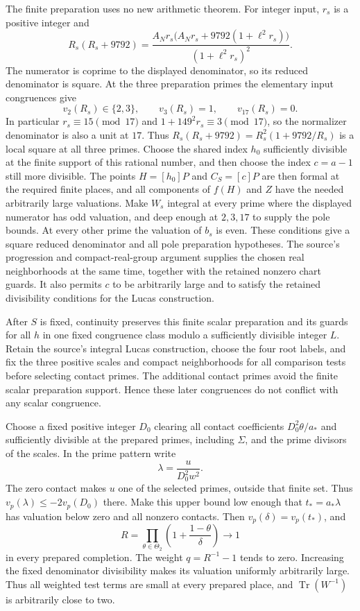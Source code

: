 \documentclass[11pt,a4paper]{article}
\DeclareMathOperator{\Tr}{Tr}\DeclareMathOperator{\Nm}{Nm}
\begin{document}
The finite preparation uses no new arithmetic theorem. For integer
input, $r_s$ is a positive integer and
\[
 R_s(R_s+9792)=
 \frac{A_Nr_s\bigl(A_Nr_s+9792(1+\ell^2r_s)\bigr)}
                    {(1+\ell^2r_s)^2}.
\]
The numerator is coprime to the displayed denominator, so its reduced
denominator is square. At the three preparation primes the elementary
input congruences give
\[
 v_2(R_s)\in\{2,3\},\qquad v_3(R_s)=1,
                       \qquad v_{17}(R_s)=0.
\]
In particular $r_s\equiv15\pmod{17}$ and
$1+149^2r_s\equiv3\pmod{17}$, so the normalizer denominator is
also a unit at $17$. Thus
$R_s(R_s+9792)=R_s^2(1+9792/R_s)$ is a local square at all three primes.
Choose the shared index $h_0$ sufficiently divisible at the finite
support of this rational number, and then choose the index
$c=a-1$ still more divisible. The points $H=[h_0]P$ and $C_S=[c]P$
are then formal at the required finite places, and all components of
$f(H)$ and $Z$ have the needed arbitrarily large valuations. Make
$W_s$ integral at every prime where the displayed numerator has odd
valuation, and deep enough at $2,3,17$ to supply the pole bounds.
At every other prime the valuation of $b_s$ is even. These conditions
give a square reduced denominator and all pole preparation hypotheses.
The source's progression and compact-real-group argument supplies the
chosen real neighborhoods at the same time, together with the retained
nonzero chart guards. It also permits $c$ to be arbitrarily large and
to satisfy the retained divisibility conditions for the Lucas construction.

After $S$ is fixed, continuity preserves this finite scalar preparation
and its guards for all $h$ in one fixed congruence class modulo a
sufficiently divisible integer $L$. Retain the source's integral Lucas
construction, choose the four root labels, and fix the three positive scales
and compact neighborhoods for all comparison tests before selecting
contact primes. The additional contact primes avoid the finite scalar
preparation support. Hence these later congruences do not conflict with
any scalar congruence.

Choose a fixed positive integer $D_0$ clearing all contact coefficients
$D_0^2\theta/a_*$ and sufficiently divisible at the prepared primes,
including $\Sigma$, and the prime divisors of the scales. In the prime
pattern write
\[
                         \lambda=\frac{u}{D_0^2w^2}.
\]
The zero contact makes $u$ one of the selected primes, outside that
finite set. Thus $v_p(\lambda)\le-2v_p(D_0)$ there. Make this upper
bound low enough that $t_*=a_*\lambda$ has valuation below zero and
all nonzero contacts. Then $v_p(\delta)=v_p(t_*)$, and
\begin{equation}\label{eq:preparedsquare}
 R=\prod_{\theta\in\Theta_2}
                 \left(1+\frac{1-\theta}{\delta}\right)
       \longrightarrow1
\end{equation}
in every prepared completion. The weight $q=R^{-1}-1$ tends to zero.
Increasing the fixed denominator divisibility makes its valuation
uniformly arbitrarily large. Thus all weighted test terms are small
at every prepared place, and $\Tr(W^{-1})$ is arbitrarily close to two.
\end{document}

